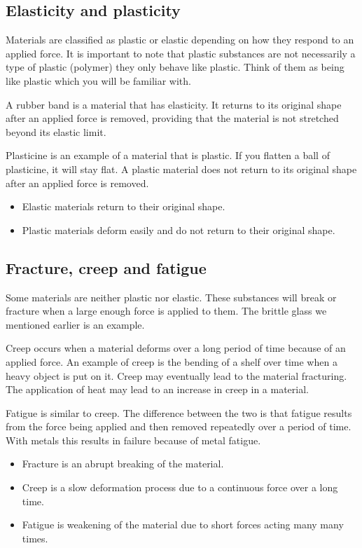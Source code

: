 \subsection{Elasticity and plasticity}

Materials are classified as plastic or elastic depending on how they respond to an applied force. It is important to note that plastic substances are not necessarily a type of plastic (polymer) they only behave like plastic. Think of them as being like plastic which you will be familiar with.

A rubber band is a material that has elasticity. It returns to its original shape after an applied force is removed, providing that the material is not stretched beyond its elastic limit.

Plasticine is an example of a material that is plastic. If you flatten a ball of plasticine, it will stay flat. A plastic material does not return to its original shape after an applied force is removed.

\begin{itemize}
\item Elastic materials return to their original shape.
\item Plastic materials deform easily and do not return to their original shape.
\end{itemize}

\subsection {Fracture, creep and fatigue}

Some materials are neither plastic nor elastic. These substances will break or fracture when a large enough force is applied to them. The brittle glass we mentioned earlier is an example.
 
Creep occurs when a material deforms over a long period of time because of an applied force. An example of creep is the bending of a shelf over time when a heavy object is put on it. Creep may eventually lead to the material fracturing. The application of heat may lead to an increase in creep in a material.

Fatigue is similar to creep. The difference between the two is that fatigue results from the force being applied and then removed repeatedly over a period of time. With metals this results in failure because of metal fatigue. 

\begin{itemize}
\item Fracture is an abrupt breaking of the material.
\item Creep is a slow deformation process due to a continuous force over a long time.
\item Fatigue is weakening of the material due to short forces acting many many times.
\end{itemize}

